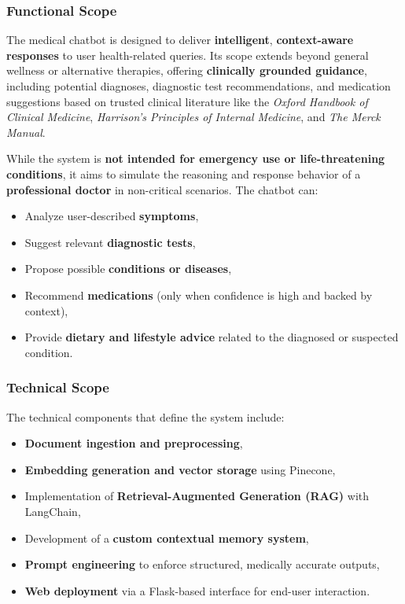 \documentclass[12pt,a4paper]{report}
\begin{document}
\subsubsection*{Functional Scope}

The medical chatbot is designed to deliver \textbf{intelligent}, \textbf{context-aware responses} to user health-related queries. Its scope extends beyond general wellness or alternative therapies, offering \textbf{clinically grounded guidance}, including potential diagnoses, diagnostic test recommendations, and medication suggestions based on trusted clinical literature like the \textit{Oxford Handbook of Clinical Medicine}, \textit{Harrison’s Principles of Internal Medicine}, and \textit{The Merck Manual}.

While the system is \textbf{not intended for emergency use or life-threatening conditions}, it aims to simulate the reasoning and response behavior of a \textbf{professional doctor} in non-critical scenarios. The chatbot can:

\begin{itemize}
    \item Analyze user-described \textbf{symptoms},
    \item Suggest relevant \textbf{diagnostic tests},
    \item Propose possible \textbf{conditions or diseases},
    \item Recommend \textbf{medications} (only when confidence is high and backed by context),
    \item Provide \textbf{dietary and lifestyle advice} related to the diagnosed or suspected condition.
\end{itemize}

\subsubsection*{Technical Scope}

The technical components that define the system include:

\begin{itemize}
    \item \textbf{Document ingestion and preprocessing},
    \item \textbf{Embedding generation and vector storage} using Pinecone,
    \item Implementation of \textbf{Retrieval-Augmented Generation (RAG)} with LangChain,
    \item Development of a \textbf{custom contextual memory system},
    \item \textbf{Prompt engineering} to enforce structured, medically accurate outputs,
    \item \textbf{Web deployment} via a Flask-based interface for end-user interaction.
\end{itemize}
\end{document}
